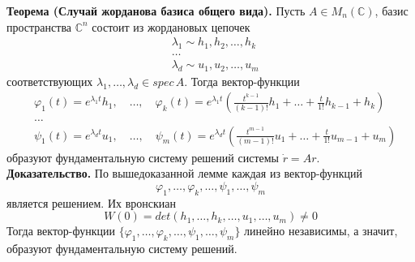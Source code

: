 \noindent \textbf{Теорема (Случай жорданова базиса общего вида).} Пусть $A \in M_n(\mathbb{C})$, базис пространства $\mathbb{C}^n$ состоит из жордановых цепочек
\begin{equation*}
    \begin{aligned}
        &\lambda_1 \sim h_1, h_2, \ldots, h_k\\
        &\ldots\\
        &\lambda_d \sim u_1, u_2, \ldots, u_m
    \end{aligned}
\end{equation*}
соответствующих $\lambda_1, \ldots, \lambda_d \in spec\, A$. Тогда вектор-функции
\begin{equation*}
    \begin{aligned}
        &\varphi_1(t) = e^{\lambda_1 t}h_1, \quad \ldots, \quad \varphi_k(t) = e^{\lambda_1 t}\left(\frac{t^{k-1}}{(k-1)!}h_1 + \ldots + \frac{t}{1!}h_{k-1} + h_k \right)\\
        &\ldots\\
        &\psi_1(t) = e^{\lambda_d t}u_1, \quad \ldots, \quad \psi_m(t) = e^{\lambda_d t}\left(\frac{t^{m-1}}{(m-1)!}u_1 + \ldots + \frac{t}{1!}u_{m-1} + u_m \right)
    \end{aligned}
\end{equation*}
образуют фундаментальную систему решений системы $\dot{r} = Ar$.\\

\noindent \textbf{Доказательство.} По вышедоказанной лемме каждая из вектор-функций
\begin{equation*}
    \varphi_1, \ldots, \varphi_k, \ldots, \psi_1, \ldots, \psi_m
\end{equation*}
является решением. Их вронскиан
\begin{equation*}
    W(0) = det(h_1, \ldots, h_k, \ldots, u_1, \ldots, u_m) \neq 0
\end{equation*}
Тогда вектор-функции $\{\varphi_1, \ldots, \varphi_k, \ldots, \psi_1, \ldots, \psi_m\}$ линейно независимы, а значит, образуют фундаментальную систему решений.\\

